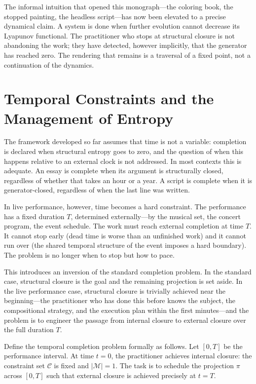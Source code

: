 \documentclass[11pt, twoside]{article}
\theoremstyle{plain}
\theoremstyle{definition}
\theoremstyle{remark}
\begin{document}
The informal intuition that opened this monograph---the coloring book, the stopped painting, the headless script---has now been elevated to a precise dynamical claim. A system is done when further evolution cannot decrease its Lyapunov functional. The practitioner who stops at structural closure is not abandoning the work; they have detected, however implicitly, that the generator has reached zero. The rendering that remains is a traversal of a fixed point, not a continuation of the dynamics.

\section{Temporal Constraints and the Management of Entropy}
\label{sec:temporal}

The framework developed so far assumes that time is not a variable: completion is declared when structural entropy goes to zero, and the question of when this happens relative to an external clock is not addressed. In most contexts this is adequate. An essay is complete when its argument is structurally closed, regardless of whether that takes an hour or a year. A script is complete when it is generator-closed, regardless of when the last line was written.

In live performance, however, time becomes a hard constraint. The performance has a fixed duration $T$, determined externally---by the musical set, the concert program, the event schedule. The work must reach external completion at time $T$. It cannot stop early (dead time is worse than an unfinished work) and it cannot run over (the shared temporal structure of the event imposes a hard boundary). The problem is no longer when to stop but how to pace.

This introduces an inversion of the standard completion problem. In the standard case, structural closure is the goal and the remaining projection is set aside. In the live performance case, structural closure is trivially achieved near the beginning---the practitioner who has done this before knows the subject, the compositional strategy, and the execution plan within the first minutes---and the problem is to engineer the passage from internal closure to external closure over the full duration $T$.

Define the temporal completion problem formally as follows. Let $[0, T]$ be the performance interval. At time $t = 0$, the practitioner achieves internal closure: the constraint set $\mathcal{C}$ is fixed and $|\mathcal{M}| = 1$. The task is to schedule the projection $\pi$ across $[0, T]$ such that external closure is achieved precisely at $t = T$.
\end{document}
